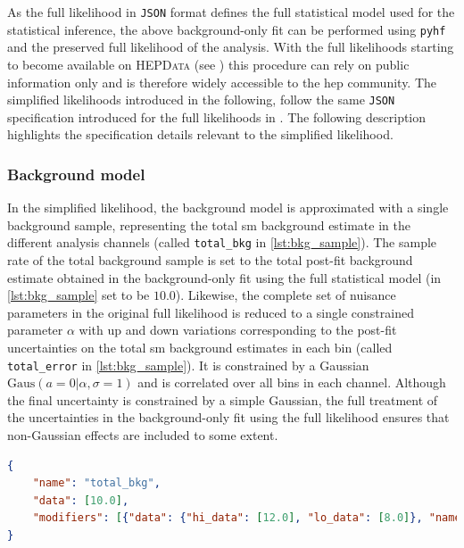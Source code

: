 As the full likelihood in \texttt{JSON} format defines the full statistical model used for the statistical inference, the above background-only fit can be performed using \texttt{pyhf} and the preserved full likelihood of the analysis. With the full likelihoods starting to become available on \textsc{HEPData} (see \eg {}\cite{fullLH_1Lbb}) this procedure can rely on public information only and is therefore widely accessible to the \gls{hep} community. The simplified likelihoods introduced in the following, follow the same \texttt{JSON} specification introduced for the full likelihoods in \cite{ATL-PHYS-PUB-2019-029}. The following description highlights the specification details relevant to the simplified likelihood. 

\subsubsection{Background model}

In the simplified likelihood, the background model is approximated with a single background sample, representing the total \gls{sm} background estimate in the different analysis channels (called \texttt{total\_bkg} in \cref{lst:bkg_sample}). The sample rate of the total background sample is set to the total post-fit background estimate obtained in the background-only fit using the full statistical model (in \cref{lst:bkg_sample} set to be $10.0$). Likewise, the complete set of nuisance parameters in the original full likelihood is reduced to a single constrained parameter $\alpha$ with up and down variations corresponding to the post-fit uncertainties on the total \gls{sm} background estimates in each bin (called \texttt{total\_error} in \cref{lst:bkg_sample}). It is constrained by a Gaussian $\mathrm{Gaus}(a = 0 \vert \alpha , \sigma = 1)$ and is correlated over all bins in each channel. Although the final uncertainty is constrained by a simple Gaussian, the full treatment of the uncertainties in the background-only fit using the full likelihood ensures that non-Gaussian effects are included to some extent.

\begin{minipage}{\linewidth}
\begin{lstlisting}[language=json,firstnumber=1,caption={Example of a total background sample with sample rate and total uncertainty as derived from a previous fit in the \glspl{sr} and \glspl{cr}.},captionpos=b, label=lst:bkg_sample]
{
	"name": "total_bkg",
	"data": [10.0],
	"modifiers": [{"data": {"hi_data": [12.0], "lo_data": [8.0]}, "name": "total_error", "type": "histosys"}]
}
\end{lstlisting}
\end{minipage}

